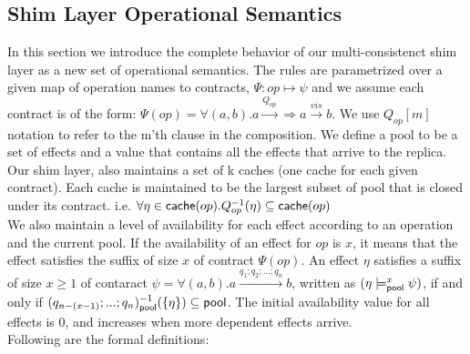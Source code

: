 \subsection {Shim Layer Operational Semantics}
In this section we introduce the complete behavior of our multi-consistenct shim layer as a new set of operational semantics. 
The rules are parametrized over a given map of operation names to
contracts, $\Psi :  op
\mapsto \psi $ and we assume each contract is of the form:
$\Psi(op)=\forall (a,b). a \xrightarrow{Q_{op}} \Rightarrow a \xrightarrow{vis} b.$ 
We use $Q_{op}[m]$ notation to refer to the m'th clause in the composition.
We define a pool to be a set of effects and a value that contains all
the effects that arrive to the replica. 
Our shim layer, also maintains a set of k caches (one cache for each
given contract). Each cache is maintained to be the largest
subset of pool that is closed under its
contract.  i.e. $\forall \eta \in {\normalfont \textsf{cache}}(op). Q_{op}^{-1}(\eta)
\subseteq {\normalfont \textsf{cache}}(op) $ 
\\We also maintain a level of availability for each effect
according to an operation and the current pool. If the availability of an effect for
$op$ is $x$, it means
that the effect satisfies the suffix of size $x$ of contract $\Psi(op)$.
An effect $\eta$ satisfies a suffix of size $x\geq 1$ of contaract
$\psi=\forall (a,b). a \xrightarrow{q_1;q_2;...;q_n} b$,
written as $ (\eta \models_{{\normalfont \textsf{pool}}}^{x} \psi )$, if and only if
$(q_{n-(x-1)};...;q_{n} )^{-1}_{{\normalfont \textsf{pool}}}(\{\eta\}) \subseteq {\normalfont \textsf{pool}}$. The
initial availability value for all effects is 0, and increases when more
dependent effects arrive. 
\\Following are the formal definitions: 

